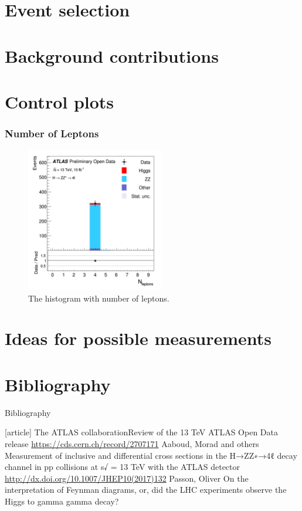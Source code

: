 \documentclass[aspectratio=1610, english]{beamer}
\begin{document}
\section{Event selection}

\section{Background contributions}

\section{Control plots}

\begin{frame}
\frametitle{Number of Leptons}

\begin{figure} [H]
\centering
\includegraphics[width=6cm]{hist_n_lept.png}
\caption{The histogram with number of leptons. }
\end{figure}

\end{frame}

\section{Ideas for possible measurements}

\section{Bibliography}
\begin{frame}[allowframebreaks]{Bibliography}
	\begin{thebibliography}{9}
		[article]
			{The ATLAS collaboration\newblock Review of the 13 TeV ATLAS Open Data release \newblock \url{https://cds.cern.ch/record/2707171}}
			{Aaboud, Morad and others \newblock Measurement of inclusive and differential cross sections in the H→ZZ∗→4ℓ decay channel in pp collisions at s√ = 13 TeV with the ATLAS detector \newblock \url{http://dx.doi.org/10.1007/JHEP10(2017)132}}
			{Passon, Oliver \newblock On the interpretation of Feynman diagrams, or, did the LHC experiments observe the Higgs to gamma gamma decay?}
	\end{thebibliography}
\end{frame}
\end{document}
